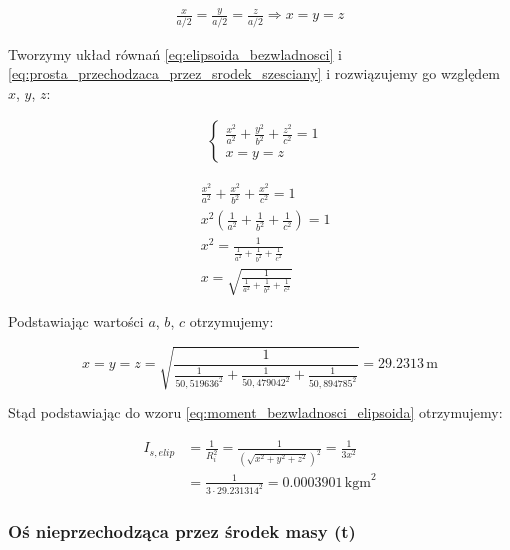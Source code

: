 \documentclass[a4paper,12pt]{article}
\begin{document}
\begin{align} \label{eq:prosta_przechodzaca_przez_srodek_szesciany}
    \frac{x}{a/2} = \frac{y}{a/2} = \frac{z}{a/2}
    \Rightarrow
    x = y = z
\end{align}

Tworzymy układ równań \eqref{eq:elipsoida_bezwladnosci} i \eqref{eq:prosta_przechodzaca_przez_srodek_szesciany} i rozwiązujemy go względem $x$, $y$, $z$:

\begin{align*} \label{eq:rozwiazanie_ukladu_rownan}
     & \begin{cases}
           \frac{x^2}{a^2} + \frac{y^2}{b^2} + \frac{z^2}{c^2}  = 1 \\
           x = y = z
       \end{cases}
\end{align*}

\begin{align*}
     & \frac{x^2}{a^2} + \frac{x^2}{b^2} + \frac{x^2}{c^2} = 1              \\
     & x^2 \left( \frac{1}{a^2} + \frac{1}{b^2} + \frac{1}{c^2} \right) = 1 \\
     & x^2 = \frac{1}{\frac{1}{a^2} + \frac{1}{b^2} + \frac{1}{c^2}}        \\
     & x = \sqrt{\frac{1}{\frac{1}{a^2} + \frac{1}{b^2} + \frac{1}{c^2}}}
\end{align*}

Podstawiając wartości $a$, $b$, $c$ otrzymujemy:

\begin{equation*}
    x = y = z = \sqrt{\frac{1}{\frac{1}{50,519636^2} + \frac{1}{50,479042^2} + \frac{1}{50,894785^2}}} = 29.2313\,\text{m}
\end{equation*}

Stąd podstawiając do wzoru \eqref{eq:moment_bezwladnosci_elipsoida} otrzymujemy:

\begin{align*}
    I_{s, elip} & = \frac{1}{R_i^2} = \frac{1}{(\sqrt{x^2 + y^2 + z^2})^2}  = \frac{1}{3x^2} \\
                & = \frac{1}{ 3 \cdot 29.231314^2} = 0.0003901\,\text{kgm}^2
\end{align*}

\subsubsection{Oś nieprzechodząca przez środek masy (t)}
\end{document}
